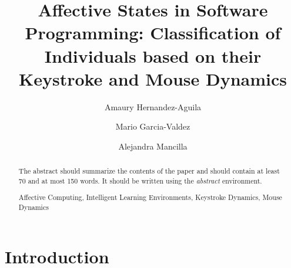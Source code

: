 \documentclass[runningheads,a4paper]{llncs}
\newcommand{\keywords}[1]{\par\addvspace\baselineskip
\noindent\keywordname\enspace\ignorespaces#1}
\begin{document}
\mainmatter  %

\title{Affective States in Software Programming: Classification of Individuals based on their Keystroke and Mouse
Dynamics}


%
%
\author{Amaury Hernandez-Aguila%
\and Mario Garcia-Valdez\and Alejandra Mancilla}
%


%
%

\maketitle


\begin{abstract}
The abstract should summarize the contents of the paper and should
contain at least 70 and at most 150 words. It should be written using the
\emph{abstract} environment.
\keywords{Affective Computing, Intelligent Learning Environments, Keystroke Dynamics, Mouse Dynamics}
\end{abstract}


\section{Introduction}
 
\end{document}
